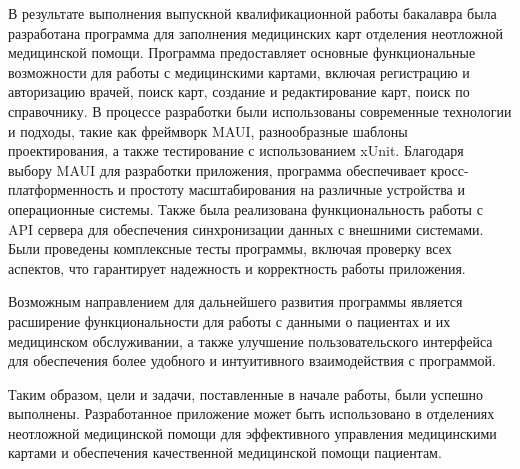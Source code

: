 \conclusion

В результате выполнения выпускной квалификационной работы бакалавра была разработана программа для заполнения медицинских карт отделения неотложной медицинской помощи. Программа предоставляет основные функциональные возможности для работы с медицинскими картами, включая регистрацию и авторизацию врачей, поиск карт, создание и редактирование карт, поиск по справочнику. В процессе разработки были использованы современные технологии и подходы, такие как фреймворк MAUI, разнообразные шаблоны проектирования, а также тестирование с использованием xUnit. Благодаря выбору MAUI для разработки приложения, программа обеспечивает кросс-платформенность и простоту масштабирования на различные устройства и операционные системы. Также была реализована функциональность работы с API сервера для обеспечения синхронизации данных с внешними системами. Были проведены комплексные тесты программы, включая проверку всех аспектов, что гарантирует надежность и корректность работы приложения.

Возможным направлением для дальнейшего развития программы является расширение функциональности для работы с данными о пациентах и их медицинском обслуживании, а также улучшение пользовательского интерфейса для обеспечения более удобного и интуитивного взаимодействия с программой.

Таким образом, цели и задачи, поставленные в начале работы, были успешно выполнены. Разработанное приложение может быть использовано в отделениях неотложной медицинской помощи для эффективного управления медицинскими картами и обеспечения качественной медицинской помощи пациентам.